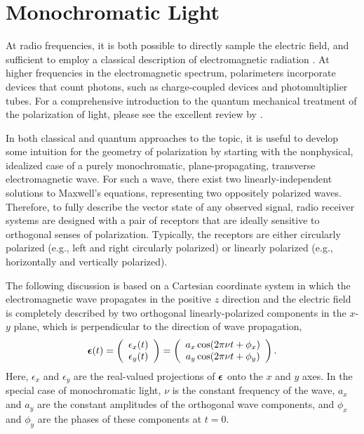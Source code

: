 \section{Monochromatic Light}
\label{sec:geometry}

At radio frequencies, it is both possible to directly sample the electric field, and sufficient to employ a classical description of electromagnetic radiation \citep{Maxwell1865,bw80}.
%
At higher frequencies in the electromagnetic spectrum, polarimeters incorporate devices that count photons, such as charge-coupled devices and photomultiplier tubes.
%
For a comprehensive introduction to the quantum mechanical treatment of the polarization of light, please see
the excellent review by \citet{2021AdOP...13....1G}.

In both classical and quantum approaches to the topic, it is useful to develop some intuition for the geometry of polarization by starting with the nonphysical, idealized case of a purely monochromatic, plane-propagating, transverse electromagnetic wave.
%
For such a wave, there exist two linearly-independent solutions to Maxwell's equations, representing two oppositely polarized waves.  
%
Therefore, to fully describe the vector state of any observed signal, radio receiver systems are designed with a pair of receptors that are ideally sensitive to orthogonal senses of polarization.
%
Typically, the receptors are either circularly polarized (e.g.,  left and right circularly polarized)
or linearly polarized (e.g.,  horizontally and vertically polarized).

The following discussion is based on a Cartesian coordinate system in which the electromagnetic wave propagates in the positive $z$ direction and the electric field is completely described by two orthogonal linearly-polarized components in the $x$-$y$ plane, which is perpendicular to the direction of wave propagation,
\begin{equation}
	\mbox{\boldmath $\epsilon$}(t) =
	\left( 
	\begin{array}{c}
		\epsilon_x(t) \\
		\epsilon_y(t)
	\end{array}
	\right) =
	\left( 
	\begin{array}{c}
		a_x \cos (2\pi \nu t + \phi_x) \\
		a_y \cos (2\pi \nu t + \phi_y)
	\end{array}
	\right). \label{eqn:real_valued_wave}
\end{equation}
Here, $\epsilon_x$ and $\epsilon_y$ are the real-valued
projections of $\mbox{\boldmath $\epsilon$}$ onto the $x$ and $y$ axes.
%
In the special case of monochromatic light, $\nu$ is the constant frequency of the wave, $a_x$ and $a_y$ are the constant amplitudes of the orthogonal wave components, and $\phi_x$ and $\phi_y$ are the phases of these components at $t=0$.

